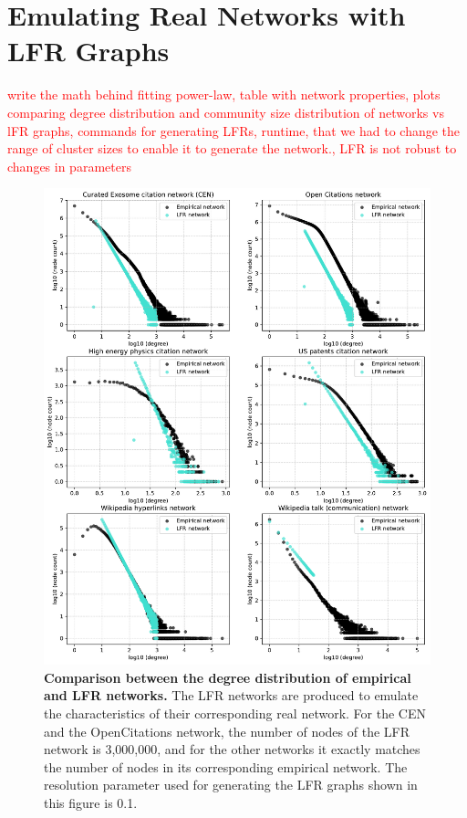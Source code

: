 \documentclass[a4paper]{article}   	%
\begin{document}
\section{Emulating Real Networks with LFR Graphs}

\textcolor{red}{write the math behind fitting power-law, table with network properties, plots comparing degree distribution and community size distribution of networks vs lFR graphs, commands for generating LFRs, runtime, that we had to change the range of cluster sizes to enable it to generate the network., LFR is not robust to changes in parameters}

\begin{figure}[H]
\centering
\includegraphics[width=0.85\linewidth]{figs/all_degrees.pdf}
\caption[Comparison between the degree distribution of empirical and LFR networks.]{\textbf{Comparison between the degree distribution of empirical and LFR networks.} The LFR networks are produced to emulate the characteristics of their corresponding real network. For the CEN and the OpenCitations network, the number of nodes of the LFR network is 3,000,000, and for the other networks it exactly matches the number of nodes in its corresponding empirical network. The resolution parameter used for generating the LFR graphs shown in this figure is 0.1. }
\end{figure}
\end{document}
